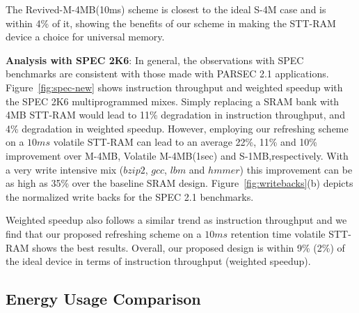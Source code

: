 The Revived-M-4MB(10ms) scheme is closest to the ideal S-4M case and is within 4\% of it, showing the benefits of our scheme in making the STT-RAM device a choice for universal memory.

\begin{figure*} [t]
\centering
 \caption{\label{fig:spec-new} Normalized Average Instruction Throughput(IT) and Weighted Speedup(WS) for SPEC 2K6 multiprogrammed mixes. }
\end{figure*}

{\bf Analysis with SPEC 2K6}: In general, the observations with SPEC benchmarks are consistent with those made with PARSEC 2.1 applications. Figure~\ref{fig:spec-new} shows instruction throughput and weighted speedup with the  SPEC 2K6 multiprogrammed
mixes. Simply replacing a SRAM bank with 4MB STT-RAM would lead to 11\% degradation in instruction throughput, and 4\% degradation in weighted speedup. However, employing our refreshing scheme on a $10ms$ volatile STT-RAM can lead to an average 22\%, 11\%  and 10\% improvement over M-4MB, Volatile M-4MB(1sec) and S-1MB,respectively. With a very write intensive mix ($bzip2$, $gcc$, $lbm$ and $hmmer$) this improvement can be as high as 35\% over the baseline SRAM design. Figure~\ref{fig:writebacks}(b) depicts the normalized write backs for
the SPEC 2.1 benchmarks.


Weighted speedup also follows a similar trend as instruction throughput and we find that our proposed refreshing scheme on a $10ms$ retention time volatile STT-RAM shows the best results. Overall, our proposed design is within 9\% (2\%) of the ideal device in terms of instruction throughput (weighted speedup).

\subsection{Energy Usage Comparison}

